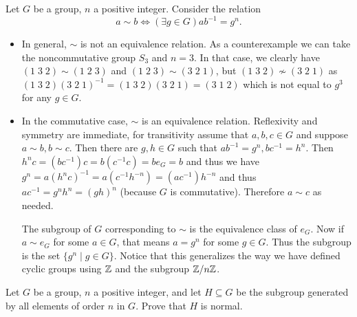 \begin{solution}
	Let $G$ be a group, $n$ a positive integer. Consider the relation
	\[
		a \sim b \Longleftrightarrow (\exists g \in G) ab^{-1} = g^n \text{.}
	\]
	
	\begin{itemize}
		\item In general, $\sim$ is not an equivalence relation. As a counterexample we can take the noncommutative group $S_3$ and $n=3$. In that case, we clearly have $(1\;3\;2) \sim (1\;2\;3)$ and $(1\;2\;3) \sim (3\;2\;1)$, but $(1\;3\;2) \not \sim (3\;2\;1)$ as $(1\;3\;2)(3\;2\;1)^{-1} = (1\;3\;2)(3\;2\;1) = (3\;1\;2)$ which is not equal to $g^3$ for any $g \in G$. 
		\item In the commutative case, $\sim$ is an equivalence relation. Reflexivity and symmetry are immediate, for transitivity assume that $a, b, c \in G$ and suppose $a \sim b, b \sim c$. Then there are $g, h \in G$ such that
		$ab^{-1} = g^n, bc^{-1} = h^n$. Then $h^n c = (b c^{-1}) c = b (c^{-1} c) = b e_G = b$ and thus we have $g^n = a (h^n c)^{-1} = a (c^{-1} h^{-n}) = (a c^{-1}) h^{-n}$ and thus $a c^{-1} = g^n h^n = (gh)^n$ (because $G$ is commutative). Therefore $a \sim c$ as needed.
		
		The subgroup of $G$ corresponding to $\sim$ is the equivalence class of $e_G$. Now if $a \sim e_G$ for some $a \in G$, that means $a = g^n$ for some $g \in G$. Thus the subgroup is the set $\{ g^n \mid g \in G \}$. Notice that this generalizes the way we have defined cyclic groups using $\mathbb{Z}$ and the subgroup $\mathbb{Z}/n\mathbb{Z}$.
	\end{itemize}
	\qedhere
\end{solution}

\begin{problem}
	Let $G$ be a group, $n$ a positive integer, and let $H \subseteq G$ be the subgroup generated by all elements of order $n$ in $G$. Prove that $H$ is normal.
\end{problem}

